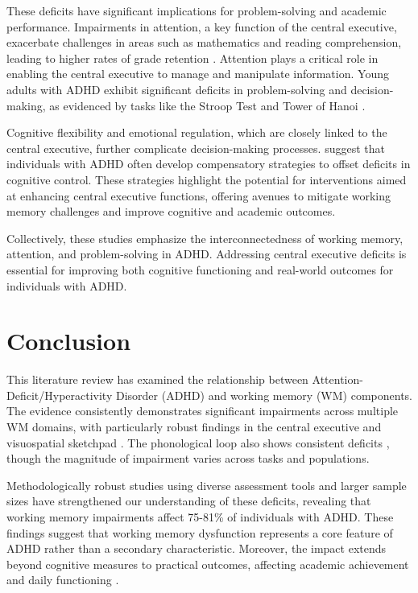 \documentclass[stu]{apa7}
\begin{document}
These deficits have significant implications for problem-solving and academic performance. Impairments in attention, a key function of the central executive, exacerbate challenges in areas such as mathematics and reading comprehension, leading to higher rates of grade retention \parencite{fried_clinical_2016, friedman_reading_2017}. Attention plays a critical role in enabling the central executive to manage and manipulate information. Young adults with ADHD exhibit significant deficits in problem-solving and decision-making, as evidenced by tasks like the Stroop Test and Tower of Hanoi \parencite{capri_attention_2019}.

Cognitive flexibility and emotional regulation, which are closely linked to the central executive, further complicate decision-making processes. \textcite{drigas_executive_2019} suggest that individuals with ADHD often develop compensatory strategies to offset deficits in cognitive control. These strategies highlight the potential for interventions aimed at enhancing central executive functions, offering avenues to mitigate working memory challenges and improve cognitive and academic outcomes.

Collectively, these studies emphasize the interconnectedness of working memory, attention, and problem-solving in ADHD. Addressing central executive deficits is essential for improving both cognitive functioning and real-world outcomes for individuals with ADHD.

\section{Conclusion}

This literature review has examined the relationship between Attention-Deficit/Hyperactivity Disorder (ADHD) and working memory (WM) components. The evidence consistently demonstrates significant impairments across multiple WM domains, with particularly robust findings in the central executive \parencite{mccabe_relationship_2010} and visuospatial sketchpad \parencite{butzbach_basic_2019}. The phonological loop also shows consistent deficits \parencite{friedman_reading_2017}, though the magnitude of impairment varies across tasks and populations.

Methodologically robust studies using diverse assessment tools and larger sample sizes \parencite{fried_clinical_2016} have strengthened our understanding of these deficits, revealing that working memory impairments affect 75-81\% of individuals with ADHD. These findings suggest that working memory dysfunction represents a core feature of ADHD rather than a secondary characteristic. Moreover, the impact extends beyond cognitive measures to practical outcomes, affecting academic achievement and daily functioning \parencite{kofler_working_2020}.
\end{document}
